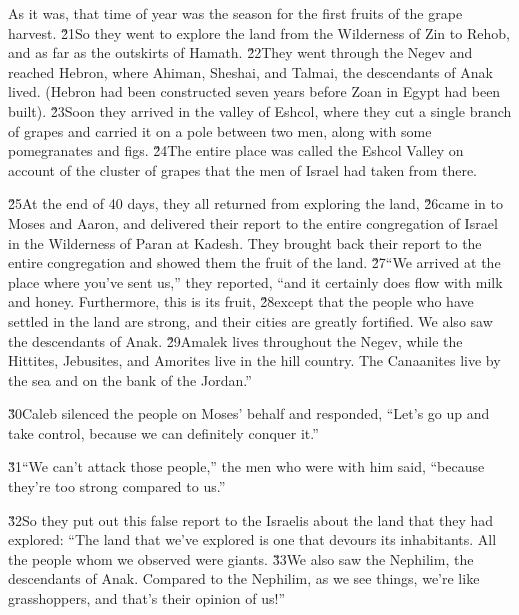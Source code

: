 As it was, that time of year was the season for the first fruits of the grape harvest. \v{21}So they went to explore the land from the Wilderness of Zin to Rehob, and as far as the outskirts of Hamath. \v{22}They went through the Negev and reached Hebron, where Ahiman, Sheshai, and Talmai, the descendants of Anak lived. (Hebron had been constructed seven years before Zoan in Egypt had been built). \v{23}Soon they arrived in the valley of Eshcol, where they cut a single branch of grapes and carried it on a pole between two men, along with some pomegranates and figs. \v{24}The entire place was called the Eshcol Valley on account of the cluster of grapes that the men of Israel had taken from there.

\v{25}At the end of 40 days, they all returned from exploring the land, \v{26}came in to Moses and Aaron, and delivered their report to the entire congregation of Israel in the Wilderness of Paran at Kadesh. They brought back their report to the entire congregation and showed them the fruit of the land. \v{27}``We arrived at the place where you've sent us,'' they reported, ``and it certainly does flow with milk and honey. Furthermore, this is its fruit, \v{28}except that the people who have settled in the land are strong, and their cities are greatly fortified. We also saw the descendants of Anak. \v{29}Amalek lives throughout the Negev, while the Hittites, Jebusites, and Amorites live in the hill country. The Canaanites live by the sea and on the bank of the Jordan.''

\v{30}Caleb silenced the people on Moses' behalf and responded, ``Let's go up and take control, because we can definitely conquer it.''

\v{31}``We can't attack those people,'' the men who were with him said, ``because they're too strong compared to us.''

\v{32}So they put out this false report to the Israelis about the land that they had explored: ``The land that we've explored is one that devours its inhabitants. All the people whom we observed were giants. \v{33}We also saw the Nephilim, the descendants of Anak. Compared to the Nephilim, as we see things, we're like grasshoppers, and that's their opinion of us!''

